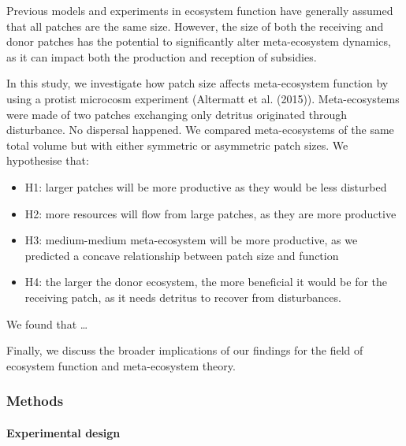 \documentclass[
]{article}
\begin{document}
Previous models and experiments in ecosystem function have generally
assumed that all patches are the same size. However, the size of both
the receiving and donor patches has the potential to significantly alter
meta-ecosystem dynamics, as it can impact both the production and
reception of subsidies.

In this study, we investigate how patch size affects meta-ecosystem
function by using a protist microcosm experiment (Altermatt et al.
(2015)). Meta-ecosystems were made of two patches exchanging only
detritus originated through disturbance. No dispersal happened. We
compared meta-ecosystems of the same total volume but with either
symmetric or asymmetric patch sizes. We hypothesise that:

\begin{itemize}
\item
  H1: larger patches will be more productive as they would be less
  disturbed
\item
  H2: more resources will flow from large patches, as they are more
  productive
\item
  H3: medium-medium meta-ecosystem will be more productive, as we
  predicted a concave relationship between patch size and function
\item
  H4: the larger the donor ecosystem, the more beneficial it would be
  for the receiving patch, as it needs detritus to recover from
  disturbances.
\end{itemize}

We found that \ldots{}

Finally, we discuss the broader implications of our findings for the
field of ecosystem function and meta-ecosystem theory.

\hypertarget{methods}{%
\subsubsection{Methods}\label{methods}}

\hypertarget{experimental-design}{%
\paragraph{Experimental design}\label{experimental-design}}
\end{document}
